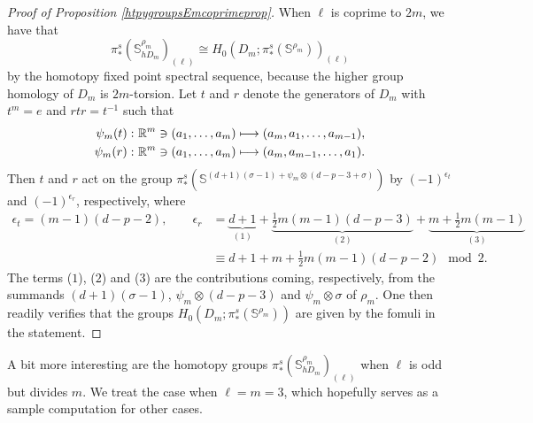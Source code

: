 \documentclass[a4paper, oneside]{amsart}
\newcommand{\1}{\mathds{1}}
\theoremstyle{remark}
\theoremstyle{definition}
\newcommand{\R}{{\scaleobj{0.97}{\mathbb{R}}}}
\newcommand{\s}{\mathbb{S}}
\numberwithin{equation}{section}
\begin{document}
\begin{proof}[Proof of Proposition \ref{htpygroupsEmcoprimeprop}]
When $\ell$ is coprime to $2m$, we have that
$$
\pi_*^s(\s^{\rho_m}_{hD_m})_{(\ell)}\cong H_0(D_m; \pi_*^s(\s^{\rho_m}))_{(\ell)}
$$
by the homotopy fixed point spectral sequence, because the higher group homology of $D_m$ is $2m$-torsion. Let $t$ and $r$ denote the generators of $D_m$ with $t^m=e$ and $rtr=t^{-1}$ such that
\begin{align*}
\psi_m(t):&\ \R^m\ni(a_1,\dots,a_m)\longmapsto (a_m,a_1,\dots,a_{m-1}),\\
\psi_m(r):&\ \R^m\ni(a_1,\dots,a_m)\longmapsto (a_m,a_{m-1},\dots,a_{1}).
\end{align*}
Then $t$ and $r$ act on the group $\pi^s_*(\s^{(d+1)(\sigma-1)+\psi_m\otimes(d-p-3+\sigma)})$ by $(-1)^{\epsilon_t}$ and $(-1)^{\epsilon_{r}}$, respectively, where
\begin{align*}
    \epsilon_t=(m-1)(d-p-2), \qquad \epsilon_r&=\underbrace{d+1}_{(1)}+\underbrace{\frac{1}{2}m(m-1)(d-p-3)}_{(2)}+\underbrace{m+\frac{1}{2}m(m-1)}_{(3)}\\
    &\equiv d+1+m+\frac{1}{2}m(m-1)(d-p-2)\mod 2.
\end{align*}
The terms ($1$), ($2$) and ($3$) are the contributions coming, respectively, from the summands $(d+1)(\sigma-1)$, $\psi_m\otimes(d-p-3)$ and $\psi_m\otimes\sigma$ of $\rho_m$. One then readily verifies that the groups $H_0(D_m; \pi^s_*(\s^{\rho_m}))$ are given by the fomuli in the statement.
\end{proof}







A bit more interesting are the homotopy groups $\pi^s_*(\s^{\rho_m}_{hD_m})_{(\ell)}$ when $\ell$ is odd but divides $m$. We treat the case when $\ell=m=3$, which hopefully serves as a sample computation for other cases. 
\end{document}
